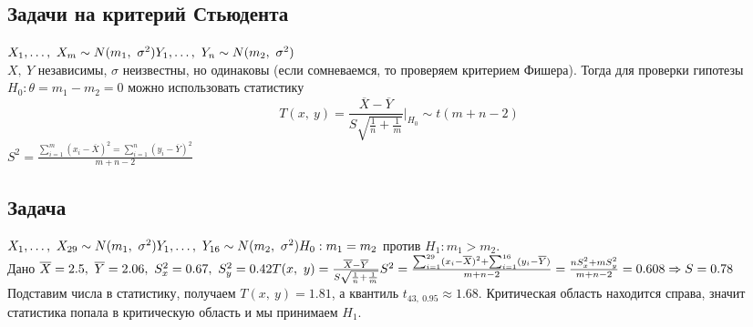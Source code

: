 \documentclass[12pt, a4paper]{article}
\begin{document}
\subsection*{Задачи на критерий Стьюдента}
$X_1,\dots,\ X_m \sim N(m_1,\ \sigma^2)\\
Y_1,\dots,\ Y_n \sim N(m_2,\ \sigma^2)$\\
$X,\ Y$ независимы, $\sigma$ неизвестны, но одинаковы (если сомневаемся, то проверяем критерием Фишера). Тогда для проверки гипотезы $H_0: \theta =  m_1 - m_2 = 0$ можно использовать статистику
\[T(x,\ y) = \frac{\overline{X} - \overline{Y}}{S\sqrt{\frac{1}{n} + \frac{1}{m}}}\Big|_{H_{0}} \sim t(m + n - 2)\]
$S^2 = \frac{\sum_{i = 1}^{m} (x_i - \overline{X})^2 = \sum_{i = 1}^{n} (y_i - \overline{Y})^2}{m + n - 2}$
\subsection*{Задача}
$X_1,\dots,\ X_{29} \sim N(m_1,\ \sigma^2)\\
Y_1,\dots,\ Y_{16} \sim N(m_2,\ \sigma^2)\\
H_0: m_1 = m_2$ против $H_1: m_1 > m_2$.\\
Дано $\overline{X} = 2.5,\ \overline{Y} = 2.06,\ S_{x}^2 = 0.67,\ S_{y}^2 = 0.42\\
T(x,\ y) = \frac{\overline{X} - \overline{Y}}{S\sqrt{\frac{1}{n} + \frac{1}{m} }}\\
S^2 = \frac{\sum_{i = 1}^{29} (x_i - \overline{X})^2 + \sum_{i = 1}^{16} (y_i - \overline{Y})}{m + n - 2} = \frac{nS_x^2 + mS_y^2}{m + n - 2} = 0.608\Rightarrow S = 0.78$\\
Подставим числа в статистику, получаем $T(x,\ y) = 1.81$, а квантиль $t_{43,\ 0.95} \approx 1.68$. Критическая область находится справа, значит статистика попала в критическую область и мы принимаем $H_1$.
\end{document}

